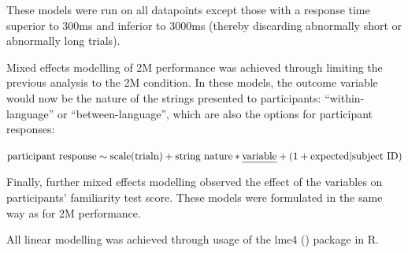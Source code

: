 \noindent
These models were run on all datapoints except those with a response time superior to 300ms and inferior to 3000ms (thereby discarding abnormally short or abnormally long trials).

Mixed effects modelling of 2M performance was achieved through limiting the previous analysis to the 2M condition. In these models, the outcome variable would now be the nature of the strings presented to participants: ``within-language'' or ``between-language'', which are also the options for participant responses:

\noindent
\begin{center}
    $\textrm{participant response} \sim \textrm{scale(trialn)} + \textrm{string nature} \ast \textrm{\emph{variable}} + (1 + \textrm{expected} \vert \textrm{subject ID})$
\end{center}

Finally, further mixed effects modelling observed the effect of the variables on participants' familiarity test score. These models were formulated in the same way as for 2M performance.

All linear modelling was achieved through usage of the lme4 (\cite{Bates2015}) package in R.